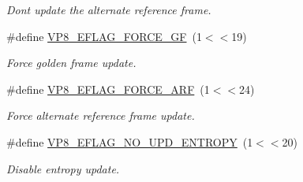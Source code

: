 \begin{DoxyCompactItemize}
\begin{DoxyCompactList}\small\item\em Don\textquotesingle{}t update the alternate reference frame. \end{DoxyCompactList}\item 
\#define \hyperlink{group__vp8__encoder_gacb64c00adcb361f72a9a3028eb12f5ff}{V\+P8\+\_\+\+E\+F\+L\+A\+G\+\_\+\+F\+O\+R\+C\+E\+\_\+\+GF}~(1$<$$<$19)
\begin{DoxyCompactList}\small\item\em Force golden frame update. \end{DoxyCompactList}\item 
\#define \hyperlink{group__vp8__encoder_ga50584fe4bdb62ff935347576539650b7}{V\+P8\+\_\+\+E\+F\+L\+A\+G\+\_\+\+F\+O\+R\+C\+E\+\_\+\+A\+RF}~(1$<$$<$24)
\begin{DoxyCompactList}\small\item\em Force alternate reference frame update. \end{DoxyCompactList}\item 
\#define \hyperlink{group__vp8__encoder_ga5b91ad179910d4efc23aef66c7b2148b}{V\+P8\+\_\+\+E\+F\+L\+A\+G\+\_\+\+N\+O\+\_\+\+U\+P\+D\+\_\+\+E\+N\+T\+R\+O\+PY}~(1$<$$<$20)
\begin{DoxyCompactList}\small\item\em Disable entropy update. \end{DoxyCompactList}\end{DoxyCompactItemize}
